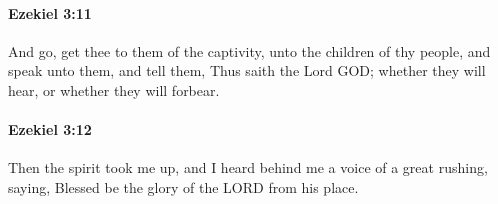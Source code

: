 		\paragraph{Ezekiel 3:11} %
			\label{EZEKIEL-3-11}

			And go, get thee to them of the captivity, unto the children of thy people, and speak unto them, and tell them, Thus saith the Lord GOD; whether they will hear, or whether they will forbear.


		\paragraph{Ezekiel 3:12} %
			\label{EZEKIEL-3-12}

			Then the spirit took me up, and I heard behind me a voice of a great rushing, saying, Blessed be the glory of the LORD from his place.


